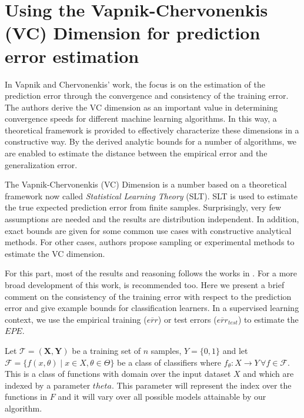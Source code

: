 \section{ Using the Vapnik-Chervonenkis (VC) Dimension for prediction error estimation}\label{section-VcDimension}


In Vapnik and Chervonenkis' work, the focus is on the estimation of the prediction error through the convergence and consistency of the training error. The authors derive the VC dimension as an important value in determining convergence speeds for different machine learning algorithms. In this way, a theoretical framework is provided to effectively characterize these dimensions in a constructive way. By the derived analytic bounds for a number of algorithms, we are enabled to estimate the distance between the empirical error and the generalization error.

The Vapnik-Chervonenkis (VC) Dimension is a number based on a theoretical framework now called \textit{Statistical Learning Theory} (SLT). SLT is used to estimate the true expected prediction error from finite samples. Surprisingly, very few assumptions are needed and the results are distribution independent. In addition, exact bounds are given for some common use cases with constructive analytical methods. For other cases, authors propose sampling or experimental methods to estimate the VC dimension.

For this part, most of the results and reasoning follows the works in \textcite{cherkassky-learning2007}. For a more broad development of this work, \textcite{vapnik-nature2013} is recommended too. Here we present a brief comment on the consistency of the training error with respect to the prediction error and give example bounds for classification learners. In a supervised learning context, we use the empirical training ($\overline{err}$) or test errors ($\overline{err}_{test}$) to estimate the $EPE$.

Let $\mathcal{T} = (\textbf{X},\textbf{Y})$ be a training set of $n$ samples, $Y = \{0,1 \}$ and let $\mathcal {F} = \big \{ f(x,\theta) \mid x \in X, \theta \in \Theta \big \}$ be a class of classifiers where $f_\theta: X \rightarrow Y \, \forall f \in \mathcal {F}$. This is a class of functions with domain over the input dataset $X$ and which are indexed by a parameter $theta$. This parameter will represent the index over the functions in $F$ and it will vary over all possible models attainable by our algorithm.

